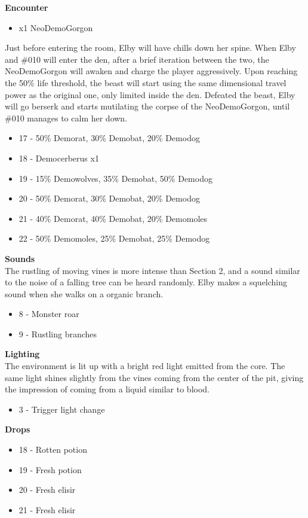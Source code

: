 \textbf{Encounter}
\begin{itemize}
	\item x1 NeoDemoGorgon
\end{itemize}
Just before entering the room, Elby will have chills down her spine. When Elby and \#010 will enter the den, after a brief iteration between the two, the NeoDemoGorgon will awaken and charge the player aggressively. Upon reaching the 50\% life threshold, the beast will start using the same dimensional travel power as the original one, only limited inside the den. Defeated the beast, Elby will go berserk and starts mutilating the corpse of the NeoDemoGorgon, until \#010 manages to calm her down.

\begin{itemize}
	\item 17 - 50\% Demorat, 30\% Demobat, 20\% Demodog
	\item 18 - Democerberus x1
	\item 19 - 15\% Demowolves, 35\% Demobat, 50\% Demodog
	\item 20 - 50\% Demorat, 30\% Demobat, 20\% Demodog
	\item 21 - 40\% Demorat, 40\% Demobat, 20\% Demomoles
	\item 22 - 50\% Demomoles, 25\% Demobat, 25\% Demodog
\end{itemize}

\textbf{Sounds}\\
The rustling of moving vines is more intense than Section 2, and a sound similar to the noise of a falling tree can be heard randomly. Elby makes a squelching sound when she walks on a organic branch.

\begin{itemize}
	\item 8 - Monster roar
	\item 9 - Rustling branches
\end{itemize}

\textbf{Lighting}\\
The environment is lit up with a bright red light emitted from the core. The same light shines slightly from the vines coming from the center of the pit, giving the impression of coming from a liquid similar to blood.

\begin{itemize}
	\item 3 - Trigger light change
\end{itemize}

\textbf{Drops}
\begin{itemize}
	\item 18 - Rotten potion
	\item 19 - Fresh potion
	\item 20 - Fresh elisir
	\item 21 - Fresh elisir
\end{itemize}
\newpage


